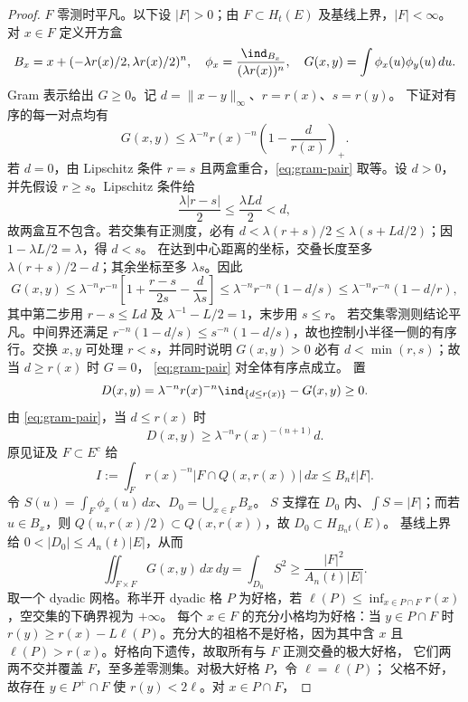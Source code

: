 \begin{proof}
$F$ 零测时平凡。以下设 $|F|>0$；由 $F\subset H_t(E)$ 及基线上界，$|F|<\infty$。对 $x\in F$ 定义开方盒
\[
B_x=x+(-\lambda r(x)/2,\lambda r(x)/2)^n,\quad \phi_x=\frac{\ind_{B_x}}{(\lambda r(x))^n},\quad G(x,y)=\int\phi_x(u)\phi_y(u)\,du.
\]
Gram 表示给出 $G\ge0$。记 $d=\|x-y\|_\infty$、$r=r(x)$、$s=r(y)$。 下证对有序的每一对点均有
\begin{equation}\label{eq:gram-pair}
G(x,y)\le\lambda^{-n}r(x)^{-n} \left(1-\frac{d}{r(x)}\right)_+.
\end{equation}
若 $d=0$，由 Lipschitz 条件 $r=s$ 且两盒重合，\eqref{eq:gram-pair} 取等。设 $d>0$，并先假设 $r\ge s$。Lipschitz 条件给
\[
\frac{\lambda|r-s|}{2}\le\frac{\lambda Ld}{2}<d,
\]
故两盒互不包含。若交集有正测度，必有 $d<\lambda(r+s)/2\le\lambda(s+Ld/2)$；因 $1-\lambda L/2=\lambda$，得 $d<s$。 在达到中心距离的坐标，交叠长度至多 $\lambda(r+s)/2-d$；其余坐标至多 $\lambda s$。因此
\[
G(x,y)\le\lambda^{-n}r^{-n} \left[1+\frac{r-s}{2s}-\frac{d}{\lambda s}\right] \le\lambda^{-n}r^{-n}(1-d/s) \le\lambda^{-n}r^{-n}(1-d/r),
\]
其中第二步用 $r-s\le Ld$ 及 $\lambda^{-1}-L/2=1$，末步用 $s\le r$。 若交集零测则结论平凡。中间界还满足 $r^{-n}(1-d/s)\le s^{-n}(1-d/s)$，故也控制小半径一侧的有序行。交换 $x,y$ 可处理 $r<s$，并同时说明 $G(x,y)>0$ 必有 $d<\min(r,s)$；故当 $d\ge r(x)$ 时 $G=0$， \eqref{eq:gram-pair} 对全体有序点成立。 置
\[
D(x,y)=\lambda^{-n}r(x)^{-n}\ind_{\{d\le r(x)\}}-G(x,y)\ge0.
\]
由 \eqref{eq:gram-pair}，当 $d\le r(x)$ 时
\begin{equation}\label{eq:gram-deficit}
D(x,y)\ge\lambda^{-n}r(x)^{-(n+1)}d.
\end{equation}
原见证及 $F\subset E^c$ 给
\begin{equation}\label{eq:lipschitz-I}
I:=\int_F r(x)^{-n}|F\cap Q(x,r(x))|\,dx\le B_n t|F|.
\end{equation}
令 $S(u)=\int_F\phi_x(u)\,dx$、$D_0=\bigcup_{x\in F}B_x$。 $S$ 支撑在 $D_0$ 内、$\int S=|F|$；而若 $u\in B_x$，则 $Q(u,r(x)/2)\subset Q(x,r(x))$，故 $D_0\subset H_{B_n t}(E)$。 基线上界给 $0<|D_0|\le A_n(t)|E|$，从而
\begin{equation}\label{eq:lipschitz-gram}
\iint_{F\times F}G(x,y)\,dx\,dy=\int_{D_0}S^2 \ge\frac{|F|^2}{A_n(t)|E|}.
\end{equation}
取一个 dyadic 网格。称半开 dyadic 格 $P$ 为好格，若 $\ell(P)\le\inf_{x\in P\cap F}r(x)$，空交集的下确界视为 $+\infty$。 每个 $x\in F$ 的充分小格均为好格：当 $y\in P\cap F$ 时 $r(y)\ge r(x)-L\ell(P)$。充分大的祖格不是好格，因为其中含 $x$ 且 $\ell(P)>r(x)$。好格向下遗传，故取所有与 $F$ 正测交叠的极大好格， 它们两两不交并覆盖 $F$，至多差零测集。对极大好格 $P$，令 $\ell=\ell(P)$； 父格不好，故存在 $y\in P^+\cap F$ 使 $r(y)<2\ell$。对 $x\in P\cap F$，

\end{proof}
